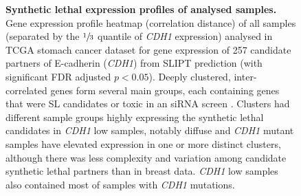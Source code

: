 \begin{figure}[!ht]
  \centering
    \caption[Synthetic lethal expression profiles of stomach samples]{\small \textbf{Synthetic lethal expression profiles of analysed samples.} Gene expression profile heatmap (correlation distance) of all samples (separated by the $\sfrac{1}{3}$ quantile of \textit{CDH1} expression) analysed in TCGA stomach cancer dataset for gene expression of 257 candidate partners of E-cadherin (\textit{CDH1}) from SLIPT prediction (with significant FDR adjusted $p < 0.05$). Deeply clustered, inter-correlated genes form several main groups, each containing genes that were SL candidates or toxic in an siRNA screen \citep{Telford2015}. Clusters had different sample groups highly expressing the synthetic lethal candidates in \textit{CDH1} low samples, notably diffuse and \textit{CDH1} mutant samples have elevated expression in one or more distinct clusters, although there was less complexity and variation among candidate synthetic lethal partners than in breast data. \textit{CDH1} low samples also contained most of samples with \textit{CDH1} mutations.
}
\label{fig:slipt_expr_stad_mtSL}
\end{figure}

